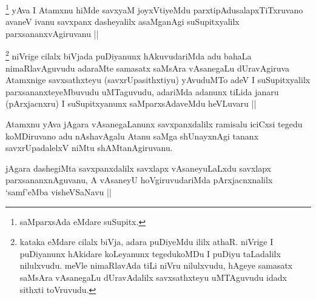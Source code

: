 \begin{artha}
\footnote[1]{saMparxsAda eMdare suSupitx.}
yAva I Atamxnu hiMde savxyaM joyxVtiyeMdu parxtipAdusalapxTiTxruvano avaneV ivanu savxpanx dasheyalilx asaMganAgi suSupitxyalilx parxsananxvAgiruvanu ||
\end{artha}


\begin{artha}
\footnote[2]{kataka eMdare cilalx biVja, adara puDiyeMdu ililx athaR. niVrige I puDiyanunx hAkidare koLeyanunx tegedukoMDu I puDiyu taLadalilx nilulxvudu. meVle nimaRlavAda tiLi niVru nilulxvudu, hAgeye samasatx saMsAra vAsanegaLu dUravAdalilx savxsathxteyu uMTAguvudu idadx sithxti toVruvudu.}
niVrige cilalx biVjada puDiyanunx hAkuvudariMda adu bahaLa nimaRlavAguvudu adaraMte samasatx saMsAra vAsanegaLu dUravAgiruva Atamxnige savxsathxteyu (savxrUpasithxtiyu) yAvuduMTo adeV I suSupitxyalilx parxsananxteyeMbuvudu uMTaguvudu, adariMda adanunx tiLida janaru (pArxjacnxru) I suSupitxyanunx saMparxsAdaveMdu heVLuvaru ||
\end{artha}


\begin{artha}
Atamxnu yAva jAgara vAsanegaLanunx savxpanxdalilx ramisalu iciCxsi tegedu koMDiruvano adu nAshavAgalu Atanu saMga shUnayxnAgi tananx savxrUpadalelxV niMtu shAMtanAgiruvanu.
\end{artha}


\begin{artha}
jAgara dashegiMta savxpanxdalilx savxlapx vAsaneyuLaLxdu savxlapx parxsananxnAguvanu, A vAsaneyU hoVgiruvudariMda pArxjacnxnalilx `samf'eMba visheVSaNavu ||
\end{artha}

